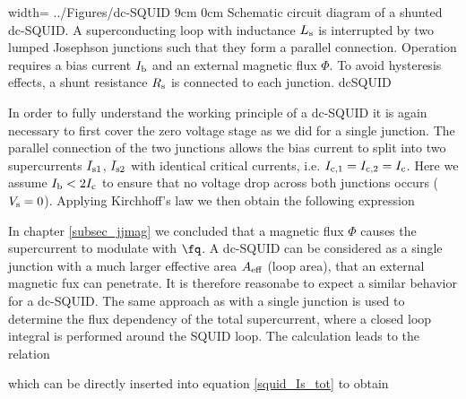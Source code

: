 {width=\textwidth} %
{../Figures/dc-SQUID}
{9cm} %
{0cm}
{Schematic circuit diagram of a shunted dc-SQUID. A superconducting loop with inductance $L_{\rm s}$ is interrupted by two lumped Josephson junctions such that they form a parallel connection. Operation requires a bias current $I_{\rm b}$ and an external magnetic flux $\Phi$. To avoid hysteresis effects, a shunt resistance $R_{\rm s}$ is connected to each junction.} 
{dcSQUID}

In order to fully understand the working principle of a dc-SQUID it is again necessary to first cover the zero voltage stage as we did for a single junction. 
The parallel connection of the two junctions allows the bias current to split into two supercurrents $I_{\rm s1}$, $I_{\rm s2}$ with identical critical currents, i.e. $I_{\rm c,1}=I_{\rm c,2}=I_{\rm c}$. Here we assume $I_{\rm b}<2I_{\rm c}$ to ensure that no voltage drop across both junctions occurs ($V_{\rm s}=0$). Applying Kirchhoff's law we then obtain the following expression 


In chapter \ref{subsec_jjmag} we concluded that a magnetic flux $\Phi$ causes the supercurrent to modulate with $\unit{\fq}$. A dc-SQUID can be considered as a single junction with a much larger effective area $A_{\rm eff}$ (loop area), that an external magnetic fux can penetrate. It is therefore reasonabe to expect a similar behavior for a dc-SQUID. The same approach as with a single junction is used to determine the flux dependency of the total supercurrent, where a closed loop integral is performed around the SQUID loop. The calculation leads to the relation \cite{Gross2016} 


which can be directly inserted into equation \ref{squid_Is_tot} to obtain


